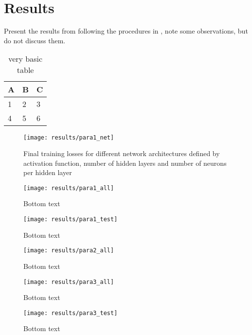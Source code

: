 \chapter{Results}\label{chapter:Results}
Present the results from following the procedures in , note some observations, but do not discuss them.

\begin{table}[h]
    \centering
    \begin{tabular}{l | l | l}
    A & B & C \\
    \hline
    1 & 2 & 3 \\
    4 & 5 & 6
    \end{tabular}
    \caption{very basic table}
    \label{tab:abc}
    \end{table}

\begin{figure}
    \centering
    \texttt{[image: results/para1\_net]}
    \caption{Final training losses for different network architectures defined by activation function, number of hidden layers and number of neurons per hidden layer}
    \label{fig:para1_net}
\end{figure}

\begin{figure}
    \centering
    \texttt{[image: results/para1\_all]}
    \caption{Bottom text}
    \label{fig:para1_all}
\end{figure}

\begin{figure}
    \centering
    \texttt{[image: results/para1\_test]}
    \caption{Bottom text}
    \label{fig:para1_test}
\end{figure}

\begin{figure}
    \centering
    \texttt{[image: results/para2\_all]}
    \caption{Bottom text}
    \label{fig:para2_all}
\end{figure}

\begin{figure}
    \centering
    \texttt{[image: results/para3\_all]}
    \caption{Bottom text}
    \label{fig:para3_all}
\end{figure}

\begin{figure}
    \centering
    \texttt{[image: results/para3\_test]}
    \caption{Bottom text}
    \label{fig:para3_test}
\end{figure}

